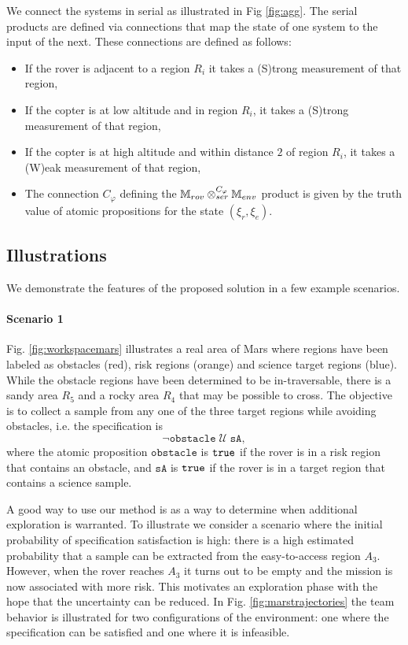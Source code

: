 \documentclass[conference]{IEEEtran}
\begin{document}
We connect the systems in serial as illustrated in Fig \ref{fig:agg}. The serial products are defined via connections that map the state of one system to the input of the next. These connections are defined as follows:
\begin{itemize}
  \item If the rover is adjacent to a region $R_i$ it takes a (S)trong measurement of that region,
  \item If the copter is at low altitude and in region $R_i$, it takes a (S)trong measurement of that region,
  \item If the copter is at high altitude and within distance $2$ of region $R_i$, it takes a (W)eak measurement of that region,
  \item The connection $C_\varphi$ defining the $\mathbb{M}_{rov} \otimes_{ser}^{C_\varphi} \mathbb{M}_{env}$ product is given by the truth value of atomic propositions for the state $(\xi_r, \xi_e)$.
\end{itemize}


\subsection{Illustrations}

We demonstrate the features of the proposed solution in a few example scenarios.

\paragraph{Scenario 1} Fig. \ref{fig:workspacemars} illustrates a real area of Mars where regions have been labeled as obstacles (red), risk regions (orange) and science target regions (blue). While the obstacle regions have been determined to be in-traversable, there is a sandy area $R_5$ and a rocky area $R_4$ that may be possible to cross. The objective is to collect a sample from any one of the three target regions while avoiding obstacles, i.e. the specification is
\begin{equation}
  \lnot \texttt{obstacle} \; \mathcal U \; \texttt{sA},
\end{equation}
where the atomic proposition $\texttt{obstacle}$ is $\texttt{true}$ if the rover is in a risk region that contains an obstacle, and $\texttt{sA}$ is $\texttt{true}$ if the rover is in a target region that contains a science sample.

A good way to use our method is as a way to determine when additional exploration is warranted. To illustrate we consider a scenario where the initial probability of specification satisfaction is high: there is a high estimated probability that a sample can be extracted from the easy-to-access region $A_3$. However, when the rover reaches $A_3$ it turns out to be empty and the mission is now associated with more risk. This motivates an exploration phase with the hope that the uncertainty can be reduced. In Fig. \ref{fig:marstrajectories} the team behavior is illustrated for two configurations of the environment: one where the specification can be satisfied and one where it is infeasible.
\end{document}
